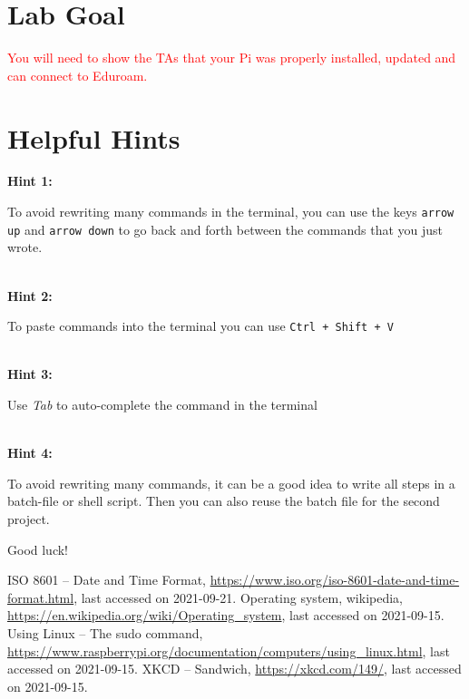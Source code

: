 \documentclass{article}
\begin{document}

\section{Lab Goal}
{\textcolor{red}{You will need to show the TAs that your Pi was properly installed, updated and can connect to Eduroam.}}

\section{Helpful Hints}

{\bf Hint 1: }\parbox[t]{14cm}{To avoid rewriting many commands in the terminal, you can use the keys \texttt{arrow up} and \texttt{arrow down} to go back and forth between the commands that you just wrote.}\\
{\bf Hint 2: }\parbox[t]{14cm}{To paste commands into the terminal you can use \texttt{Ctrl + Shift + V}}\\
{\bf Hint 3: }\parbox[t]{14cm}{Use \textit{Tab} to auto-complete the command in the terminal}\\
{\bf Hint 4: }\parbox[t]{14cm}{To avoid rewriting many commands, it can be a good idea to write all steps in a batch-file or shell script. Then you can also reuse the batch file for the second project.}
\vspace{1cm}
\begin{center}
\huge Good luck!
\end{center}

\newpage

\begin{thebibliography}{10}

 ISO 8601 -- Date and Time Format, \url{https://www.iso.org/iso-8601-date-and-time-format.html}, last accessed on 2021-09-21.
 Operating system, wikipedia, \url{https://en.wikipedia.org/wiki/Operating_system}, last accessed on 2021-09-15.
 Using Linux -- The sudo command, \url{https://www.raspberrypi.org/documentation/computers/using_linux.html}, last accessed on 2021-09-15.
 XKCD -- Sandwich, \url{https://xkcd.com/149/}, last accessed on 2021-09-15.
\end{thebibliography}
\end{document}
